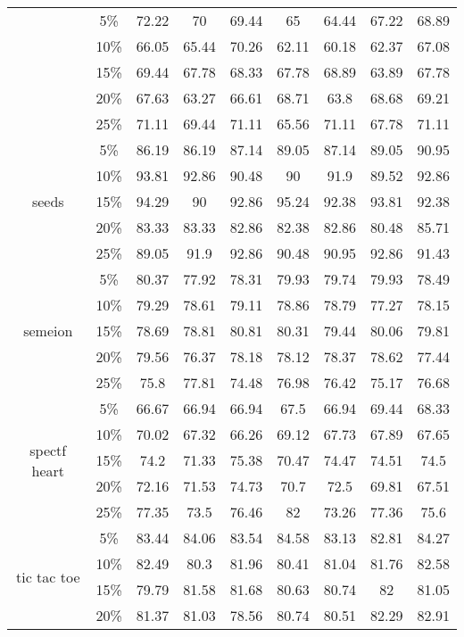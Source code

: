 \begin{longtable}[c]{|c|c|c|c|c|c|c|c|c|}
& 5\% & 72.22 & 70 & 69.44 & 65 & 64.44 & 67.22 & 68.89 \\ 
& 10\% & 66.05 & 65.44 & 70.26 & 62.11 & 60.18 & 62.37 & 67.08 \\
& 15\% & 69.44 & 67.78 & 68.33 & 67.78 & 68.89 & 63.89 & 67.78 \\
& 20\% & 67.63 & 63.27 & 66.61 & 68.71 & 63.8 & 68.68 & 69.21 \\
& 25\% & 71.11 & 69.44 & 71.11 & 65.56 & 71.11 & 67.78 & 71.11 \\ \hline
\multirow{5}{*}{seeds}
& 5\% & 86.19 & 86.19 & 87.14 & 89.05 & 87.14 & 89.05 & 90.95 \\ 
& 10\% & 93.81 & 92.86 & 90.48 & 90 & 91.9 & 89.52 & 92.86 \\
& 15\% & 94.29 & 90 & 92.86 & 95.24 & 92.38 & 93.81 & 92.38 \\
& 20\% & 83.33 & 83.33 & 82.86 & 82.38 & 82.86 & 80.48 & 85.71 \\
& 25\% & 89.05 & 91.9 & 92.86 & 90.48 & 90.95 & 92.86 & 91.43 \\ \hline
\multirow{5}{*}{semeion}
& 5\% & 80.37 & 77.92 & 78.31 & 79.93 & 79.74 & 79.93 & 78.49 \\ 
& 10\% & 79.29 & 78.61 & 79.11 & 78.86 & 78.79 & 77.27 & 78.15 \\
& 15\% & 78.69 & 78.81 & 80.81 & 80.31 & 79.44 & 80.06 & 79.81 \\
& 20\% & 79.56 & 76.37 & 78.18 & 78.12 & 78.37 & 78.62 & 77.44 \\
& 25\% & 75.8 & 77.81 & 74.48 & 76.98 & 76.42 & 75.17 & 76.68 \\ \hline
\multirow{5}{*}{spectf heart}
& 5\% & 66.67 & 66.94 & 66.94 & 67.5 & 66.94 & 69.44 & 68.33 \\ 
& 10\% & 70.02 & 67.32 & 66.26 & 69.12 & 67.73 & 67.89 & 67.65 \\
& 15\% & 74.2 & 71.33 & 75.38 & 70.47 & 74.47 & 74.51 & 74.5 \\
& 20\% & 72.16 & 71.53 & 74.73 & 70.7 & 72.5 & 69.81 & 67.51 \\
& 25\% & 77.35 & 73.5 & 76.46 & 82 & 73.26 & 77.36 & 75.6 \\ \hline
\multirow{5}{*}{tic tac toe}
& 5\% & 83.44 & 84.06 & 83.54 & 84.58 & 83.13 & 82.81 & 84.27 \\ 
& 10\% & 82.49 & 80.3 & 81.96 & 80.41 & 81.04 & 81.76 & 82.58 \\
& 15\% & 79.79 & 81.58 & 81.68 & 80.63 & 80.74 & 82 & 81.05 \\
& 20\% & 81.37 & 81.03 & 78.56 & 80.74 & 80.51 & 82.29 & 82.91 \\

\end{longtable}
